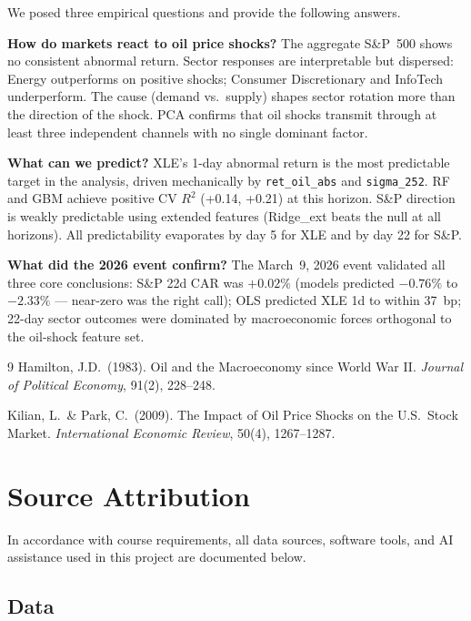 \documentclass[11pt,a4paper]{article}
\begin{document}
We posed three empirical questions and provide the following answers.

\textbf{How do markets react to oil price shocks?} The aggregate S\&P~500 shows no consistent abnormal return. Sector responses are interpretable but dispersed: Energy outperforms on positive shocks; Consumer Discretionary and InfoTech underperform. The cause (demand vs.\ supply) shapes sector rotation more than the direction of the shock. PCA confirms that oil shocks transmit through at least three independent channels with no single dominant factor.

\textbf{What can we predict?} XLE's 1-day abnormal return is the most predictable target in the analysis, driven mechanically by \texttt{ret\_oil\_abs} and \texttt{sigma\_252}. RF and GBM achieve positive CV $R^2$ (+0.14, +0.21) at this horizon. S\&P direction is weakly predictable using extended features (Ridge\_ext beats the null at all horizons). All predictability evaporates by day 5 for XLE and by day 22 for S\&P.

\textbf{What did the 2026 event confirm?} The March~9, 2026 event validated all three core conclusions: S\&P 22d CAR was $+0.02\%$ (models predicted $-0.76\%$ to $-2.33\%$ — near-zero was the right call); OLS predicted XLE 1d to within 37~bp; 22-day sector outcomes were dominated by macroeconomic forces orthogonal to the oil-shock feature set.

\begin{thebibliography}{9}
Hamilton, J.D.\ (1983). Oil and the Macroeconomy since World War II.
\textit{Journal of Political Economy}, 91(2), 228--248.

Kilian, L.\ \& Park, C.\ (2009). The Impact of Oil Price Shocks on the U.S.\ Stock Market.
\textit{International Economic Review}, 50(4), 1267--1287.
\end{thebibliography}

\appendix
\section{Source Attribution}
\label{app:attribution}

In accordance with course requirements, all data sources, software tools, and AI assistance used in this project are documented below.

\subsection{Data}
\end{document}
